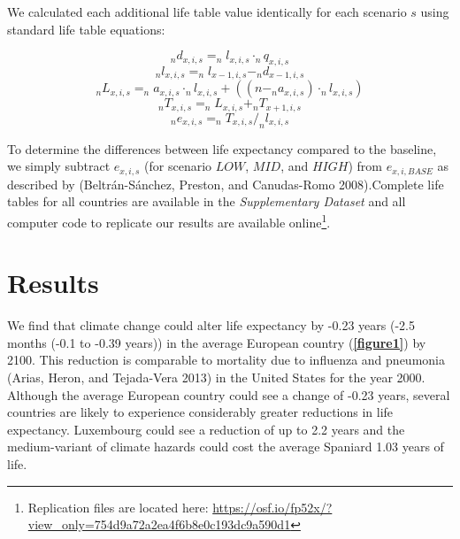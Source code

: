 \documentclass[12pt,]{article}
\begin{document}
We calculated each additional life table value identically for each
scenario \(s\) using standard life table equations:

\[_nd_{x,i,s} = _nl_{x,i,s} \cdot _nq_{x,i,s}\]
\[_nl_{x,i,s} = _nl_{x-1,i,s} - _nd_{x-1,i,s}\]
\[_nL_{x,i,s} = _na_{x,i,s} \cdot _nl_{x,i,s} + ((n-_na_{x,i,s}) \cdot _nl_{x,i,s})\]
\[_nT_{x,i,s} = _nL_{x,i,s} + _nT_{x+1,i,s}\]
\[_ne_{x,i,s} = _nT_{x,i,s} / _nl_{x,i,s}\]

To determine the differences between life expectancy compared to the
baseline, we simply subtract \(e_{x,i,s}\) (for scenario \(LOW\),
\(MID\), and \(HIGH\)) from \(e_{x,i,BASE}\) as described by
(Beltrán-Sánchez, Preston, and Canudas-Romo 2008).Complete life tables
for all countries are available in the \emph{Supplementary Dataset} and
all computer code to replicate our results are available
online\footnote{Replication files are located here:
  \url{https://osf.io/fp52x/?view_only=754d9a72a2ea4f6b8e0c193dc9a590d1}}.

\hypertarget{results}{%
\section{Results}\label{results}}

We find that climate change could alter life expectancy by -0.23 years
(-2.5 months (-0.1 to -0.39 years)) in the average European country
(\textbf{\autoref{figure1}}) by 2100. This reduction is comparable to
mortality due to influenza and pneumonia (Arias, Heron, and Tejada-Vera
2013) in the United States for the year 2000. Although the average
European country could see a change of -0.23 years, several countries
are likely to experience considerably greater reductions in life
expectancy. Luxembourg could see a reduction of up to 2.2 years and the
medium-variant of climate hazards could cost the average Spaniard 1.03
years of life.
\end{document}
